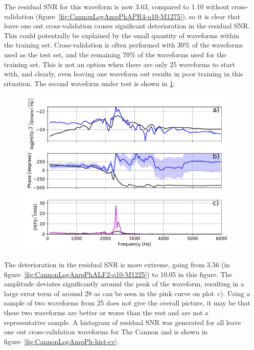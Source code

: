 The residual SNR for this waveform is now 3.63, compared to 1.10 without cross-validation (figure~\ref{fig:CannonLogAmpPhAPR4-q10-M1275}), so it is clear that leave one out cross-validation causes significant deterioration in the residual SNR. This could potentially be explained by the small quantity of waveforms within the training set. Cross-validation is often performed with 30\% of the waveforms used as the test set, and the remaining 70\% of the waveforms used for the training set. This is not an option when there are only 25 waveforms to start with, and clearly, even leaving one waveform out results in poor training in this situation. The second waveform under test is shown in \ref{fig:CannonLogAmpPhALF2-q10-M1225-cv}:
\begin{figure}[H]
	\includegraphics[width=15cm]{./img/CannonLogAmpPhALF2-q10-M1225-cv.pdf} 
	\caption[\protect]{\protect}
	\label{fig:CannonLogAmpPhALF2-q10-M1225-cv}
\end{figure}
The deterioration in the residual SNR is more extreme, going from 3.56 (in figure~\ref{fig:CannonLogAmpPhALF2-q10-M1225}) to 10.05 in this figure. The amplitude deviates significantly around the peak of the waveform, resulting in a large error term of around 28 as can be seen in the pink curve on plot~c). Using a sample of two waveforms from 25 does not give the overall picture, it may be that these two waveforms are better or worse than the rest and are not a representative sample. A histogram of residual SNR was generated for all leave one out cross-validation waveforms for The Cannon and is shown in figure~\ref{fig:CannonLogAmpPh-hist-cv}.  
